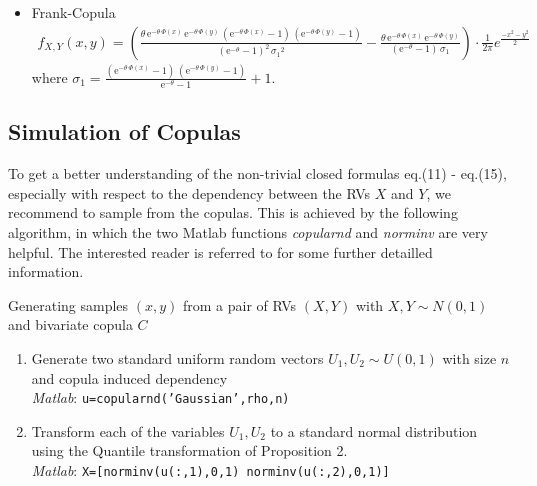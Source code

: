\documentclass[a4paper]{article}
\begin{document}
\begin{itemize}
	\item Frank-Copula
	\begin{equation}
		\begin{array}{l}
			f_{X,Y}(x,y)=\left(\frac{\theta \,{\mathrm{e}}^{-\theta \,\Phi(x) } \,{\mathrm{e}}^{-\theta \,\Phi(y) } \,{\left({\mathrm{e}}^{-\theta \,\Phi(x) } -1\right)}\,{\left({\mathrm{e}}^{-\theta \,\Phi(y) } -1\right)}}{{{\left({\mathrm{e}}^{-\theta } -1\right)}}^2 \,{\sigma_1 }^2 }-\frac{\theta \,{\mathrm{e}}^{-\theta \,\Phi(x) } \,{\mathrm{e}}^{-\theta \,\Phi(y) } }{{\left({\mathrm{e}}^{-\theta } -1\right)}\,\sigma_1 } \right) \cdot \frac{1}{2\pi }e^{\frac{-x^2-y^2}{2}} 
		\end{array}
	\end{equation}
	\hspace{3cm} where $\sigma_1 =\frac{{\left({\mathrm{e}}^{-\theta \,\Phi(x) } -1\right)}\,{\left({\mathrm{e}}^{-\theta \,\Phi(y) } -1\right)}}{{\mathrm{e}}^{-\theta } -1}+1$.
	
	
	
	
\end{itemize}

\subsection{Simulation of Copulas}
To get a better understanding of the non-trivial closed formulas eq.(11) - eq.(15), especially with respect to the dependency between the RVs $X$ and $Y$, we recommend to sample from the copulas. This is achieved by the following algorithm, in which the two Matlab functions {\it copularnd} and {\it norminv} are very helpful. The interested reader is referred to \cite{MFE05} for some further detailled information.

\begin{algorithm}
	\caption{Generating samples $(x,y)$ from a pair of RVs $(X,Y)$ with $X, Y \sim N(0,1)$ and bivariate copula $C$}
	\begin{enumerate}
		\item Generate two standard uniform random vectors $U_1, U_2 \sim U(0,1)$ with size $n$ and copula induced dependency  \\
		
		\hspace{2cm} {\it Matlab}:  \texttt{u=copularnd('Gaussian',rho,n)} \\
		
		\item Transform each of the variables $U_1, U_2$ to a standard normal distribution using the Quantile transformation of Proposition 2. \\
		
		\hspace{2cm} {\it Matlab}:  \texttt{X=[norminv(u(:,1),0,1) norminv(u(:,2),0,1)]}
	\end{enumerate}
\end{algorithm}
\end{document}
